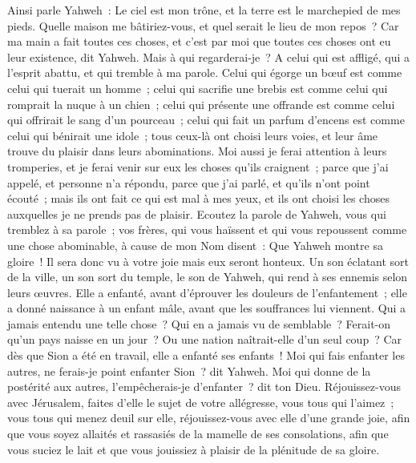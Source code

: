 \begin{multicols}{2}
\VerseOne{}Ainsi parle Yahweh~: Le ciel est mon trône, et la terre est le marchepied de mes pieds. Quelle maison me bâtiriez-vous, et quel serait le lieu de mon repos~?
Car ma main a fait toutes ces choses, et c'est par moi que toutes ces choses ont eu leur existence, dit Yahweh. Mais à qui regarderai-je~? A celui qui est affligé, qui a l'esprit abattu, et qui tremble à ma parole.
Celui qui égorge un bœuf est comme celui qui tuerait un homme~; celui qui sacrifie une brebis est comme celui qui romprait la nuque à un chien~; celui qui présente une offrande est comme celui qui offrirait le sang d'un pourceau~; celui qui fait un parfum d'encens est comme celui qui bénirait une idole~; tous ceux-là ont choisi leurs voies, et leur âme trouve du plaisir dans leurs abominations.
Moi aussi je ferai attention à leurs tromperies, et je ferai venir sur eux les choses qu'ils craignent~; parce que j'ai appelé, et personne n'a répondu, parce que j'ai parlé, et qu'ils n'ont point écouté~; mais ils ont fait ce qui est mal à mes yeux, et ils ont choisi les choses auxquelles je ne prends pas de plaisir.
Ecoutez la parole de Yahweh, vous qui tremblez à sa parole~; vos frères, qui vous haïssent et qui vous repoussent comme une chose abominable, à cause de mon Nom disent~: Que Yahweh montre sa gloire~! Il sera donc vu à votre joie mais eux seront honteux.
Un son éclatant sort de la ville, un son sort du temple, le son de Yahweh, qui rend à ses ennemis selon leurs œuvres.
Elle a enfanté, avant d'éprouver les douleurs de l'enfantement~; elle a donné naissance à un enfant mâle, avant que les souffrances lui viennent.
Qui a jamais entendu une telle chose~? Qui en a jamais vu de semblable~? Ferait-on qu'un pays naisse en un jour~? Ou une nation naîtrait-elle d'un seul coup~? Car dès que Sion a été en travail, elle a enfanté ses enfants~!
Moi qui fais enfanter les autres, ne ferais-je point enfanter Sion~? dit Yahweh. Moi qui donne de la postérité aux autres, l'empêcherais-je d'enfanter~? dit ton Dieu.
Réjouissez-vous avec Jérusalem, faites d'elle le sujet de votre allégresse, vous tous qui l'aimez~; vous tous qui menez deuil sur elle, réjouissez-vous avec elle d'une grande joie,
afin que vous soyez allaités et rassasiés de la mamelle de ses consolations, afin que vous suciez le lait et que vous jouissiez à plaisir de la plénitude de sa gloire.

\end{multicols}
